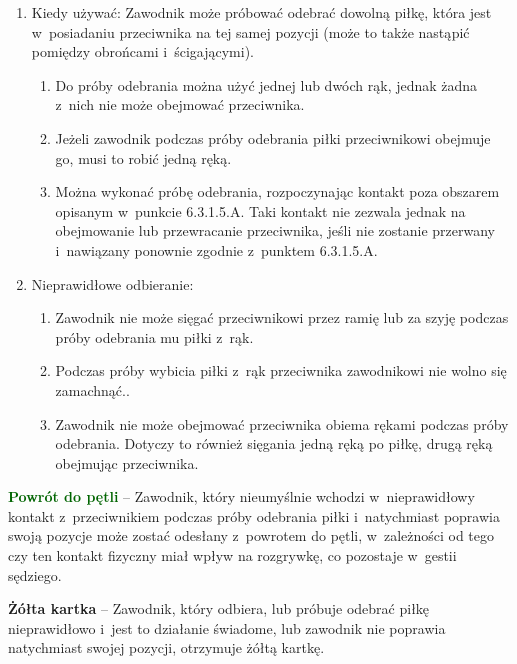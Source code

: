\documentclass[12pt]{article}
\newcommand\yellowcard[1]{\bgroup\textcolor{darkyellow}{\textbf{#1}}}
\newcommand\other[1]{\bgroup\textcolor{darkgreen}{\textbf{#1}}}
\begin{document}
\begin{enumerate}
	\item
	      Kiedy używać: Zawodnik może próbować odebrać dowolną piłkę, która jest
	      w~posiadaniu przeciwnika na tej samej pozycji (może to także nastąpić
	      pomiędzy obrońcami i~ścigającymi).

	      \begin{enumerate}
		      \item
		            Do próby odebrania można użyć jednej lub dwóch rąk, jednak żadna z~nich nie może obejmować przeciwnika.
		      \item
		            Jeżeli zawodnik podczas próby odebrania piłki przeciwnikowi obejmuje
		            go, musi to robić jedną ręką.
		      \item
		            Można wykonać próbę odebrania, rozpoczynając kontakt poza obszarem
		            opisanym w~punkcie 6.3.1.5.A. Taki kontakt nie zezwala jednak na
		            obejmowanie lub przewracanie przeciwnika, jeśli nie zostanie
		            przerwany i~nawiązany ponownie zgodnie z~punktem 6.3.1.5.A.
	      \end{enumerate}
	\item
	      Nieprawidłowe odbieranie:

	      \begin{enumerate}
		      \item
		            Zawodnik nie może sięgać przeciwnikowi przez ramię lub za szyję
		            podczas próby odebrania mu piłki z~rąk.
		      \item
		            Podczas próby wybicia piłki z~rąk przeciwnika zawodnikowi nie wolno
		            się zamachnąć..
		      \item
		            Zawodnik nie może obejmować przeciwnika obiema rękami podczas próby
		            odebrania. Dotyczy to również sięgania jedną ręką po piłkę, drugą
		            ręką obejmując przeciwnika.
	      \end{enumerate}
\end{enumerate}

\other{Powrót do pętli} -- Zawodnik, który nieumyślnie wchodzi w~nieprawidłowy kontakt z~przeciwnikiem podczas próby odebrania piłki i~natychmiast poprawia swoją pozycje może zostać odesłany z~powrotem do
pętli, w~zależności od tego czy ten kontakt fizyczny miał wpływ na
rozgrywkę, co pozostaje w~gestii sędziego.

\yellowcard{Żółta kartka} -- Zawodnik, który odbiera, lub próbuje odebrać piłkę
nieprawidłowo i~jest to działanie świadome, lub zawodnik nie poprawia
natychmiast swojej pozycji, otrzymuje żółtą kartkę.
\end{document}
